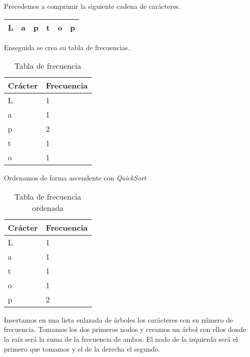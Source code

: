\documentclass[12pt,twoside]{article}
\begin{document}
Precedemos a comprimir la siguiente cadena de car\'acteres.
\begin{center}
\begin{tabular}[t]{|l |c |r |r |r |r |}
\hline
L & a & p & t & o & p\\
\hline
\end{tabular}
\end{center}
\newpage
Enseguida se crea su tabla de frecuencias.

\begin{table}[htbp]
\begin{center}
\begin{tabular}{|l|l|}
\hline
Cr\'acter & Frecuencia \\
\hline \hline
L &  1 \\ \hline
a &  1 \\ \hline
p &  2 \\ \hline
t &  1 \\ \hline
o &  1 \\ \hline
\end{tabular}
\caption{Tabla de frecuencia}
\label{tabla:Tabla1}
\end{center}
\end{table}

Ordenamos de forma ascendente con \textit{QuickSort}

\begin{table}[htbp]
\begin{center}
\begin{tabular}{|l|l|}
\hline
Cr\'acter & Frecuencia \\
\hline \hline
L &  1 \\ \hline
a &  1 \\ \hline
t &  1 \\ \hline
o &  1 \\ \hline
p &  2 \\ \hline
\end{tabular}
\caption{Tabla de frecuencia ordenada}
\label{tabla:Tabla1}
\end{center}
\end{table}

Insertamos en una lista enlazada de \'arboles los car\'acteres con su n\'umero de frecuencia.
Tomamos los dos primeros nodos y creamos un \'arbol con ellos donde la ra\'iz ser\'a la suma de la frecuencia de ambos. El nodo de la izquierda ser\'a el primero que tomamos y el de la derecha el segundo.\newline
\end{document}
